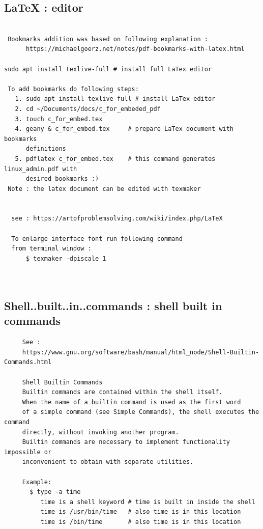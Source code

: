 \documentclass[a4paper,12pt]{article}
\begin{document}
\subsection{LaTeX     : editor}
\begin{verbatim}
  
 Bookmarks addition was based on following explanation : 
      https://michaelgoerz.net/notes/pdf-bookmarks-with-latex.html

sudo apt install texlive-full # install full LaTex editor

 To add bookmarks do following steps:
   1. sudo apt install texlive-full # install LaTex editor 
   2. cd ~/Documents/docs/c_for_embeded_pdf 
   3. touch c_for_embed.tex
   4. geany & c_for_embed.tex     # prepare LaTex document with bookmarks 
      definitions
   5. pdflatex c_for_embed.tex    # this command generates linux_admin.pdf with 
      desired bookmarks :)
 Note : the latex document can be edited with texmaker 
  

  see : https://artofproblemsolving.com/wiki/index.php/LaTeX
     
  To enlarge interface font run following command
  from terminal window :
      $ texmaker -dpiscale 1

     
\end{verbatim}



\subsection{Shell..built..in..commands     : shell built in commands}
\begin{verbatim}
     See : 
     https://www.gnu.org/software/bash/manual/html_node/Shell-Builtin-Commands.html
     
     Shell Builtin Commands
     Builtin commands are contained within the shell itself.
     When the name of a builtin command is used as the first word 
     of a simple command (see Simple Commands), the shell executes the command   
     directly, without invoking another program. 
     Builtin commands are necessary to implement functionality impossible or 
     inconvenient to obtain with separate utilities.
     
     Example: 
       $ type -a time
          time is a shell keyword # time is built in inside the shell
          time is /usr/bin/time   # also time is in this location
          time is /bin/time       # also time is in this location

\end{verbatim}
\end{document}
